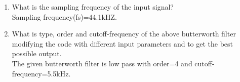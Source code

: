 \documentclass[journal,12pt,twocolumn]{IEEEtran}
\renewcommand\thesection{\arabic{section}}
\begin{document}
\begin{enumerate}[label=\thesection.\arabic*]
	\item What is the sampling frequency of the input signal?
	      \\
	      \solution
	      Sampling frequency(fs)=44.1kHZ.
	\item
	      What is type, order and  cutoff-frequency of the above butterworth filter modifying the code with different input parameters and to get the best possible output.
	      \\
	      \solution
	      The given butterworth filter is low pass with order=4 and cutoff-frequency=5.5kHz.
\end{enumerate}
\end{document}
